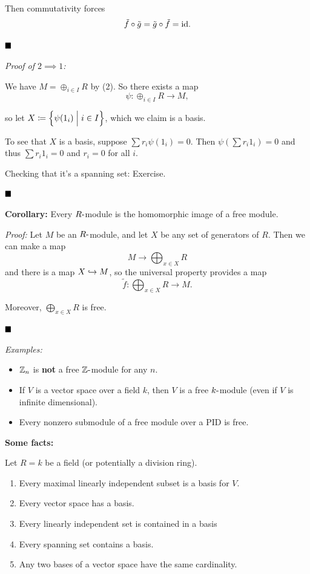 Then commutativity forces \[
\tilde f \circ \tilde g = \tilde g \circ \tilde f = \text{id}
.\]

\(\qed\)

\emph{Proof of \(2 \implies 1\):}

We have \(M = \oplus_{i\in I} R\) by (2). So there exists a map \[
\psi: \oplus_{i\in I} R \to M
,\]

so let \(X \coloneqq \left\{{\psi(1_i) \mathrel{\Big|} i\in I}\right\}\), which we claim
is a basis.

To see that \(X\) is a basis, suppose \(\sum r_i \psi(1_i) = 0\). Then
\(\psi(\sum r_i 1_i) = 0\) and thus \(\sum r_i 1_i = 0\) and \(r_i = 0\)
for all \(i\).

Checking that it's a spanning set: Exercise.

\(\qed\)

\textbf{Corollary:} Every \(R{\hbox{-}}\)module is the homomorphic image of a
free module.

\emph{Proof:} Let \(M\) be an \(R{\hbox{-}}\)module, and let \(X\) be any set
of generators of \(R\). Then we can make a map \[
M \to \bigoplus_{x\in X} R
\] and there is a map \(X \hookrightarrow M\), so the universal property
provides a map \[
\tilde f: \bigoplus_{x\in X} R \to M
.\]

Moreover, \(\bigoplus_{x\in X} R\) is free.

\(\qed\)

\emph{Examples:}

\begin{itemize}
\item
  \({\mathbb{Z}}_n\) is \textbf{not} a free \({\mathbb{Z}}{\hbox{-}}\)module for any \(n\).
\item
  If \(V\) is a vector space over a field \(k\), then \(V\) is a free
  \(k{\hbox{-}}\)module (even if \(V\) is infinite dimensional).
\item
  Every nonzero submodule of a free module over a PID is free.
\end{itemize}

\textbf{Some facts:}

Let \(R = k\) be a field (or potentially a division ring).

\begin{enumerate}
\def\labelenumi{\arabic{enumi}.}
\item
  Every maximal linearly independent subset is a basis for \(V\).
\item
  Every vector space has a basis.
\item
  Every linearly independent set is contained in a basis
\item
  Every spanning set contains a basis.
\item
  Any two bases of a vector space have the same cardinality.
\end{enumerate}

